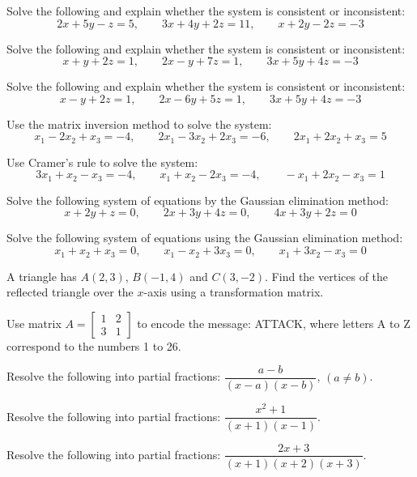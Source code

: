 \documentclass[11pt,a4paper]{article}
\begin{document}
\begin{longlist}
\item Solve the following and explain whether the system is consistent or inconsistent:
\[
2x+5y-z=5, \qquad 3x+4y+2z=11, \qquad x+2y-2z=-3
\]

\item Solve the following and explain whether the system is consistent or inconsistent:
\[
x+y+2z=1, \qquad 2x-y+7z=1, \qquad 3x+5y+4z=-3
\]

\item Solve the following and explain whether the system is consistent or inconsistent:
\[
x-y+2z=1, \qquad 2x-6y+5z=1, \qquad 3x+5y+4z=-3
\]

\item Use the matrix inversion method to solve the system:
\[
x_1-2x_2+x_3=-4, \qquad 2x_1-3x_2+2x_3=-6, \qquad 2x_1+2x_2+x_3=5
\]

\item Use Cramer's rule to solve the system:
\[
3x_1+x_2-x_3=-4, \qquad x_1+x_2-2x_3=-4, \qquad -x_1+2x_2-x_3=1
\]

\item Solve the following system of equations by the Gaussian elimination method:
\[
x+2y+z=0, \qquad 2x+3y+4z=0, \qquad 4x+3y+2z=0
\]

\item Solve the following system of equations using the Gaussian elimination method:
\[
x_1+x_2+x_3=0, \qquad x_1-x_2+3x_3=0, \qquad x_1+3x_2-x_3=0
\]

\item A triangle has $A(2,3)$, $B(-1,4)$ and $C(3,-2)$. Find the vertices of the reflected triangle over the $x$-axis using a transformation matrix.

\item Use matrix $A=\begin{bmatrix}1&2\\3&1\end{bmatrix}$ to encode the message: ATTACK, where letters A to Z correspond to the numbers 1 to 26.

\item Resolve the following into partial fractions: $\dfrac{a-b}{(x-a)(x-b)}$, $(a\neq b)$.

\item Resolve the following into partial fractions: $\dfrac{x^2+1}{(x+1)(x-1)}$.

\item Resolve the following into partial fractions: $\dfrac{2x+3}{(x+1)(x+2)(x+3)}$.


\end{longlist}
\end{document}

